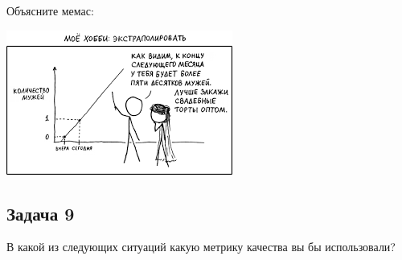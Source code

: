 \documentclass[12pt, a4paper, oneside]{article}
\begin{document}
Объясните мемас: 

\begin{center}
	\includegraphics[scale=0.7]{memes.png}
\end{center}


\subsection*{Задача 9}

В какой	из следующих ситуаций какую метрику качества вы бы использовали?  

\end{document}
